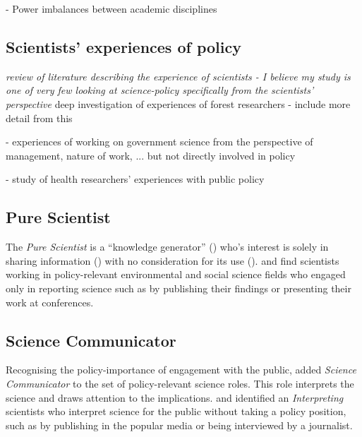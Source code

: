 \cite{BalvaneraJNOBCDGGKKMPSSW2020} - Power imbalances between academic disciplines

\subsection{Scientists' experiences of policy}\label{sec:experiences}
\emph{review of literature describing the experience of scientists - I believe my study is one of very few looking at science-policy specifically from the scientists' perspective}
\cite{OjanenBKP2021} deep investigation of experiences of forest researchers  - include more detail from this

\cite{DanfordDR2009} - experiences of working on government science from the perspective of management, nature of work, ... but not directly involved in policy

\cite{KothariME2009} - study of health researchers' experiences with public policy

\subsection{Pure Scientist}
The \emph{Pure Scientist} is a ``knowledge generator'' (\cite{BalvaneraJNOBCDGGKKMPSSW2020}) who's interest is solely in sharing information (\cite{Pielke2007}) with no consideration for its use (\cite{RapleyD2014}). \textcite{SteelLLS2004} and \textcite{SinghTKMMC2014} find scientists working in policy-relevant environmental and social science fields who engaged only in reporting science such as by publishing their findings or presenting their work at conferences.

\subsection{Science Communicator}
Recognising the policy-importance of engagement with the public, \textcite{RapleyD2014} added \emph{Science Communicator} to the set of policy-relevant science roles. This role interprets the science and draws attention to the implications. \textcite{SteelLLS2004} and \textcite{SinghTKMMC2014} identified an \emph{Interpreting} scientists who interpret science for the public without taking a policy position, such as by publishing in the popular media or being interviewed by a journalist.

